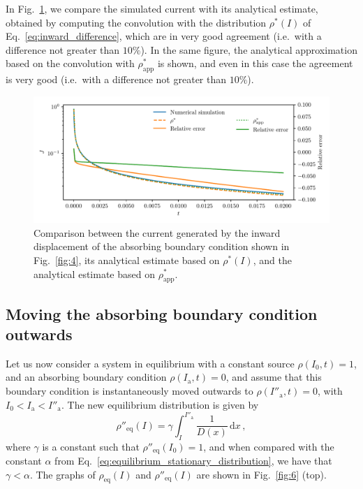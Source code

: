 In Fig.~\ref{fig:5}, we compare the simulated current with its analytical estimate, obtained by computing the convolution with the distribution $\rho^\ast(I)$ of Eq.~\eqref{eq:inward_difference}, which are in very good agreement {(i.e.\ with a difference not greater than $10\%$)}. In the same figure, the analytical approximation based on the convolution with $\rho^\ast_\text{app}$ is shown, and even in this case the agreement is very good {(i.e.\ with a difference not greater than $10\%$)}.

\begin{figure}[htp]
    \centering
    \includegraphics[width=\textwidth]{4_probing_the_diffusive_behavior/figs/final/current_backwards.pdf}
    \caption{Comparison between the current generated by the inward displacement of the absorbing boundary condition shown in Fig.~\ref{fig:4}, its analytical estimate based on $\rho^\ast(I)$, and the analytical estimate based on $\rho^\ast_\text{app}$.}
    \label{fig:5}
\end{figure}


\subsection{Moving the absorbing boundary condition outwards}


Let us now consider a system in equilibrium with a constant source $\rho(I_0, t)=1$, and an absorbing boundary condition $\rho(I_\mathrm{a}, t)=0$, and assume that this boundary condition is instantaneously moved outwards to $\rho(I''_\mathrm{a}, t)=0$, with $I_0 < I_\mathrm{a} < I''_\mathrm{a}$. The new equilibrium distribution is given by
\begin{equation}
    \rho''_\text{eq}(I) = \gamma \int_I^{I''_\mathrm{a}} \frac{1}{D(x)}\,\mathrm{d}x\,,
\end{equation}
where $\gamma$ is a constant such that $\rho''_\text{eq}(I_0)=1$, and when compared with the constant $\alpha$ from Eq.~\eqref{eq:equilibrium_stationary_distribution}, we have that $\gamma < \alpha$. The graphs of $\rho_\text{eq}(I)$ and $\rho''_\text{eq}(I)$ are shown in Fig.~\ref{fig:6} (top). 

